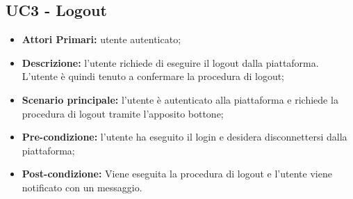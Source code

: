 \subsection{UC3 - Logout}
\begin{itemize}
	\item \textbf{Attori Primari:} utente autenticato;
	\item \textbf{Descrizione:} l'utente richiede di eseguire il logout dalla piattaforma. L'utente è quindi tenuto a confermare la procedura di logout;
	\item \textbf{Scenario principale:} l'utente è autenticato alla piattaforma e richiede la procedura di logout tramite l'apposito bottone;
	\item \textbf{Pre-condizione:} l'utente ha eseguito il login e desidera disconnettersi dalla piattaforma;
	\item \textbf{Post-condizione:} Viene eseguita la procedura di logout e l'utente viene notificato con un messaggio.
\end{itemize}